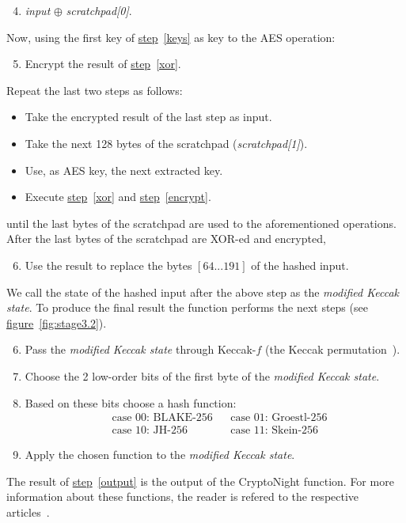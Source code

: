 \begin{enumerate}
  \setcounter{enumi}{3}
  \item \label{xor} \emph{input} $\oplus$ \emph{scratchpad[0]}.
\end{enumerate}
Now, using the first key of \hyperref[keys]{step}~\ref{keys} as key to the AES operation:

\begin{enumerate}
  \setcounter{enumi}{4}
  \item \label{encrypt} Encrypt the result of \hyperref[xor]{step}~\ref{xor}.
\end{enumerate}
Repeat the last two steps as follows:

\begin{itemize}
  \item Take the encrypted result of the last step as input.
  \item Take the next 128 bytes of the scratchpad (\emph{scratchpad[1]}).
  \item Use, as AES key, the next extracted key.
  \item Execute \hyperref[xor]{step}~\ref{xor} and \hyperref[encrypt]{step}~\ref{encrypt}.
\end{itemize}
until the last bytes of the scratchpad are used to the aforementioned operations. After the last bytes of the scratchpad are XOR-ed and encrypted,

\begin{enumerate}
  \setcounter{enumi}{5}
  \item \label{modified} Use the result to replace the bytes $[64...191]$ of the hashed input.
\end{enumerate}
We call the state of the hashed input after the above step as the \emph{modified Keccak state}. To produce the final result the function performs the next steps (see \hyperref[fig:stage3.1]{figure}~\ref{fig:stage3.2}).

\begin{enumerate}
  \setcounter{enumi}{5}
  \item Pass the \emph{modified Keccak state} through Keccak-$f$ (the Keccak permutation~\cite{keccak}).
  \item Choose the 2 low-order bits of the first byte of the \emph{modified Keccak state}.
  \item Based on these bits choose a hash function:
  \begin{align*}
     &\mbox{case 00: BLAKE-256} &
     &\mbox{case 01: Groestl-256}\\
     &\mbox{case 10: JH-256} &
     &\mbox{case 11: Skein-256}
  \end{align*}
  \item \label{output} Apply the chosen function to the \emph{modified Keccak state}.
\end{enumerate}
The result of \hyperref[output]{step}~\ref{output} is the output of the CryptoNight function. For more information about these functions, the reader is refered to the respective articles~\cite{10030667226,sha3groestl,sha3W09,sha3F+08}.

